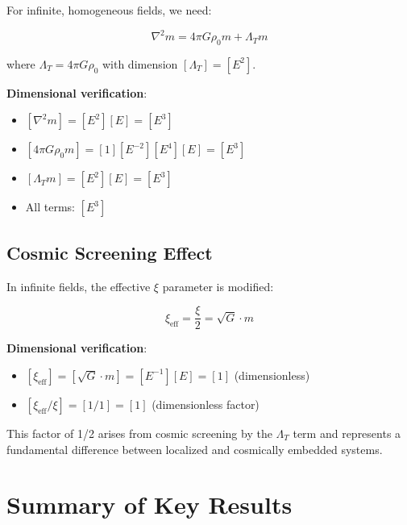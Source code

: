 \documentclass[12pt,a4paper]{article}
\begin{document}
	For infinite, homogeneous fields, we need:
	
	\begin{equation}
		\label{eq:infinite_field_equation}
		\nabla^2 m = 4\pi G \rho_0 m + \Lambda_T m
	\end{equation}
	
	where $\Lambda_T = 4\pi G \rho_0$ with dimension $[\Lambda_T] = [E^2]$.
	
	\textbf{Dimensional verification}:
	\begin{itemize}
		\item $[\nabla^2 m] = [E^2][E] = [E^3]$
		\item $[4\pi G \rho_0 m] = [1][E^{-2}][E^4][E] = [E^3]$
		\item $[\Lambda_T m] = [E^2][E] = [E^3]$
		\item All terms: $[E^3]$ \checkmark
	\end{itemize}
	
	\subsection{Cosmic Screening Effect}
	\label{subsec:cosmic_screening}
	
	In infinite fields, the effective $\xi$ parameter is modified:
	
	\begin{equation}
		\label{eq:xi_effective}
		\xi_{\text{eff}} = \frac{\xi}{2} = \sqrt{G} \cdot m
	\end{equation}
	
	\textbf{Dimensional verification}:
	\begin{itemize}
		\item $[\xi_{\text{eff}}] = [\sqrt{G} \cdot m] = [E^{-1}][E] = [1]$ (dimensionless) \checkmark
		\item $[\xi_{\text{eff}}/\xi] = [1/1] = [1]$ (dimensionless factor) \checkmark
	\end{itemize}
	
	This factor of 1/2 arises from cosmic screening by the $\Lambda_T$ term and represents a fundamental difference between localized and cosmically embedded systems.
	
	\section{Summary of Key Results}
	\label{sec:key_results}
	
\end{document}
